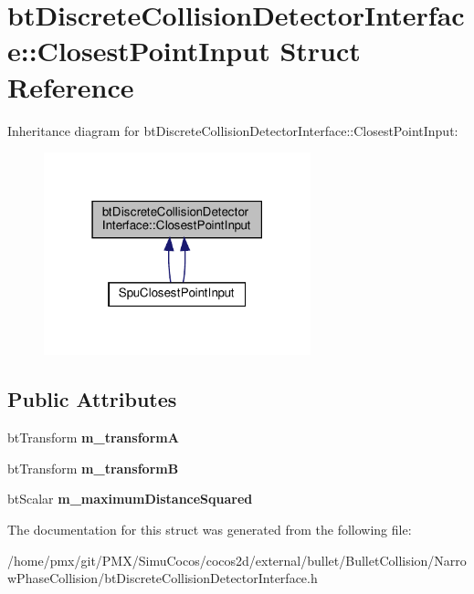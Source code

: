 \hypertarget{structbtDiscreteCollisionDetectorInterface_1_1ClosestPointInput}{}\section{bt\+Discrete\+Collision\+Detector\+Interface\+:\+:Closest\+Point\+Input Struct Reference}
\label{structbtDiscreteCollisionDetectorInterface_1_1ClosestPointInput}


Inheritance diagram for bt\+Discrete\+Collision\+Detector\+Interface\+:\+:Closest\+Point\+Input\+:
\nopagebreak
\begin{figure}[H]
\begin{center}
\leavevmode
\includegraphics[width=219pt]{structbtDiscreteCollisionDetectorInterface_1_1ClosestPointInput__inherit__graph}
\end{center}
\end{figure}
\subsection*{Public Attributes}
\begin{DoxyCompactItemize}
\item 
\mbox{\label{structbtDiscreteCollisionDetectorInterface_1_1ClosestPointInput_a7d3e89234d3bf33d65f204fd3e6011b2}} 
bt\+Transform {\bfseries m\+\_\+transformA}
\item 
\mbox{\label{structbtDiscreteCollisionDetectorInterface_1_1ClosestPointInput_a67dd72d1a1e0a4dd433530f9b396ee5f}} 
bt\+Transform {\bfseries m\+\_\+transformB}
\item 
\mbox{\label{structbtDiscreteCollisionDetectorInterface_1_1ClosestPointInput_ae371e325c4e3131d2c5bbbf473895ae8}} 
bt\+Scalar {\bfseries m\+\_\+maximum\+Distance\+Squared}
\end{DoxyCompactItemize}


The documentation for this struct was generated from the following file\+:\begin{DoxyCompactItemize}
\item 
/home/pmx/git/\+P\+M\+X/\+Simu\+Cocos/cocos2d/external/bullet/\+Bullet\+Collision/\+Narrow\+Phase\+Collision/bt\+Discrete\+Collision\+Detector\+Interface.\+h\end{DoxyCompactItemize}
